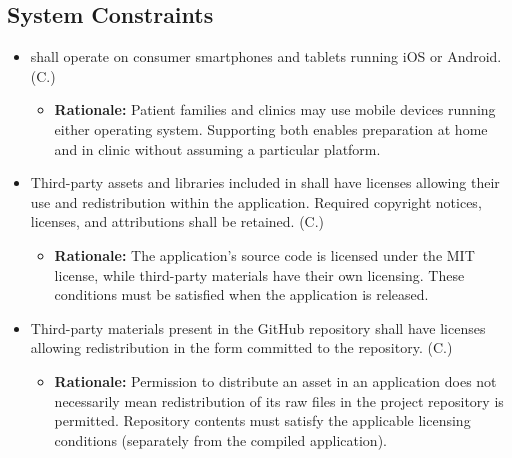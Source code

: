 \documentclass[12pt]{article}
\newcounter{connum} %
\begin{document}

\subsection{System Constraints}

\begin{itemize}
    \item \progname{} shall operate on consumer smartphones and tablets running
    iOS or Android.
    (C.\theconnum\label{C_MobilePlatforms})
    \begin{itemize}
        \item \textbf{Rationale:} Patient families and clinics may use mobile devices running
        either operating system. Supporting both enables preparation
        at home and in clinic without assuming a particular platform.
    \end{itemize}

    \item Third-party assets and libraries included in \progname{} shall have
    licenses allowing their use and redistribution within the application.
    Required copyright notices, licenses, and attributions shall be retained.
    (C.\theconnum\label{C_ApplicationLicensing})
    \begin{itemize}
        \item \textbf{Rationale:} The application's source code is licensed under the
        MIT license, while third-party materials have their own licensing.
        These conditions must be satisfied when the application is released.
    \end{itemize}

    \item Third-party materials present in the \progname{} GitHub
    repository shall have licenses allowing redistribution in the form committed to the repository.
    (C.\theconnum\label{C_RepositoryLicensing})
    \begin{itemize}
        \item \textbf{Rationale:} Permission to distribute an asset in
        an application does not necessarily mean redistribution of its raw
        files in the project repository is permitted. Repository contents must satisfy
        the applicable licensing conditions (separately from the compiled application).
    \end{itemize}


\end{itemize}
\end{document}
